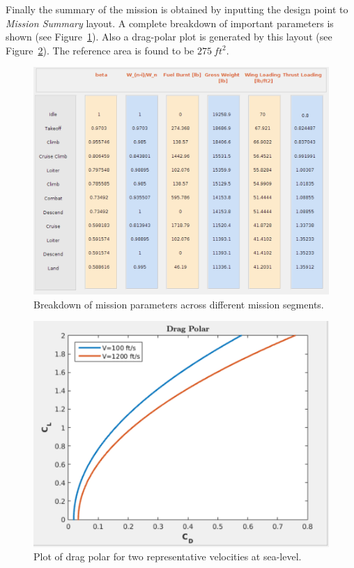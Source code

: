 \documentclass[pdftex,11pt,letter]{article}
\begin{document}
Finally the summary of the mission is obtained by inputting the design point to \textit{Mission Summary} layout. A complete breakdown of important parameters is shown (see Figure~\ref{missionsum}). Also a drag-polar plot is generated by this layout (see Figure~\ref{dragpolar}). The reference area is found to be $275~ft^2$.

\begin{figure}[h]
\centering
	\includegraphics[scale=0.6]{figures/missionsum.pdf}
        \caption{Breakdown of mission parameters across different mission segments.}
\label{missionsum}
\end{figure}


\begin{figure}[h]
\centering
	\includegraphics[scale=0.45]{figures/dragpolar.pdf}
        \caption{Plot of drag polar for two representative velocities at sea-level.}
\label{dragpolar}
\end{figure}
\end{document}
